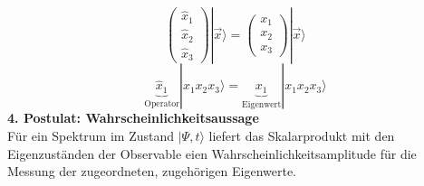 \documentclass[10pt,article,colorback,accentcolor=tud9d]{scrartcl}
\begin{document}
\begin{fleqn}
\begin{equation}
    \end{equation}
    \begin{equation}
    \left(\begin{array}{c} \hat{x}_1 \\ \hat{x}_2 \\ \hat{x}_3 \end{array}\right)\left.\right|\vec{x}\rangle=\left(\begin{array}{c} x_1 \\ x_2 \\ x_3 \end{array}\right)\left.\right|\vec{x}\rangle
    \end{equation}
    \begin{equation}
    \underbrace{\hat{x}_1}_{\text{Operator}}\left.\right|x_1x_2x_3\rangle=\underbrace{x_1}_{\text{Eigenwert}}\left.\right|x_1x_2x_3\rangle
    \end{equation}
  \textbf{4. Postulat: Wahrscheinlichkeitsaussage}\\
    Für ein Spektrum im Zustand $\left.\right|\Psi,t\rangle$ liefert das Skalarprodukt mit den Eigenzuständen der Observable eien Wahrscheinlichkeitsamplitude für die Messung der zugeordneten, zugehörigen Eigenwerte.
\end{fleqn}
\end{document}
